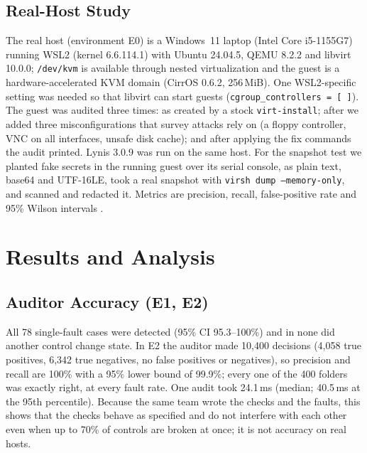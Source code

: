 \documentclass[conference]{IEEEtran}
\begin{document}
\subsection{Real-Host Study}
The real host (environment E0) is a Windows~11 laptop (Intel Core i5-1155G7) running WSL2 (kernel 6.6.114.1) with Ubuntu 24.04.5, QEMU 8.2.2 and libvirt 10.0.0; \texttt{/dev/kvm} is available through nested virtualization and the guest is a hardware-accelerated KVM domain (CirrOS 0.6.2, 256\,MiB). One WSL2-specific setting was needed so that libvirt can start guests (\texttt{cgroup\_controllers = [ ]}). The guest was audited three times: as created by a stock \texttt{virt-install}; after we added three misconfigurations that survey attacks rely on (a floppy controller, VNC on all interfaces, unsafe disk cache); and after applying the fix commands the audit printed. Lynis 3.0.9 was run on the same host. For the snapshot test we planted fake secrets in the running guest over its serial console, as plain text, base64 and UTF-16LE, took a real snapshot with \texttt{virsh dump --memory-only}, and scanned and redacted it. Metrics are precision, recall, false-positive rate and 95\% Wilson intervals \cite{wilson}.

\section{Results and Analysis}
\subsection{Auditor Accuracy (E1, E2)}
All 78 single-fault cases were detected (95\% CI 95.3--100\%) and in none did another control change state. In E2 the auditor made 10,400 decisions (4,058 true positives, 6,342 true negatives, no false positives or negatives), so precision and recall are 100\% with a 95\% lower bound of 99.9\%; every one of the 400 folders was exactly right, at every fault rate. One audit took 24.1\,ms (median; 40.5\,ms at the 95th percentile). Because the same team wrote the checks and the faults, this shows that the checks behave as specified and do not interfere with each other even when up to 70\% of controls are broken at once; it is not accuracy on real hosts.
\end{document}
